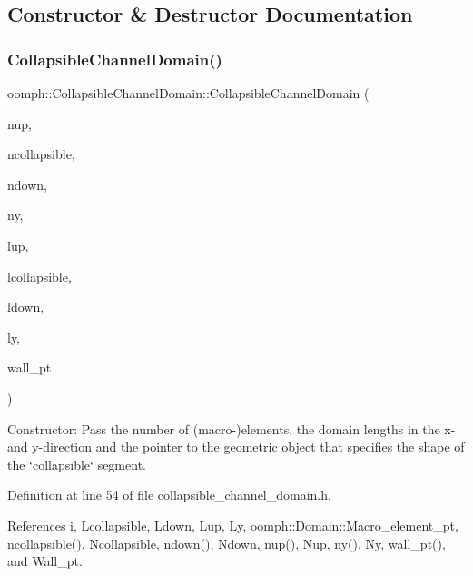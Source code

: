 \subsection{Constructor \& Destructor Documentation}
\mbox{\label{classoomph_1_1CollapsibleChannelDomain_a85e64b812b36155302407269d77dc6b3}} 
\subsubsection{\texorpdfstring{Collapsible\+Channel\+Domain()}{CollapsibleChannelDomain()}}
{\footnotesize\ttfamily oomph\+::\+Collapsible\+Channel\+Domain\+::\+Collapsible\+Channel\+Domain (\begin{DoxyParamCaption}\item[{const unsigned \&}]{nup,  }\item[{const unsigned \&}]{ncollapsible,  }\item[{const unsigned \&}]{ndown,  }\item[{const unsigned \&}]{ny,  }\item[{const double \&}]{lup,  }\item[{const double \&}]{lcollapsible,  }\item[{const double \&}]{ldown,  }\item[{const double \&}]{ly,  }\item[{\hyperlink{classoomph_1_1GeomObject}{Geom\+Object} $\ast$}]{wall\+\_\+pt }\end{DoxyParamCaption})\hspace{0.3cm}{\ttfamily [inline]}}



Constructor\+: Pass the number of (macro-\/)elements, the domain lengths in the x-\/ and y-\/direction and the pointer to the geometric object that specifies the shape of the \char`\"{}collapsible\char`\"{} segment. 



Definition at line 54 of file collapsible\+\_\+channel\+\_\+domain.\+h.



References i, Lcollapsible, Ldown, Lup, Ly, oomph\+::\+Domain\+::\+Macro\+\_\+element\+\_\+pt, ncollapsible(), Ncollapsible, ndown(), Ndown, nup(), Nup, ny(), Ny, wall\+\_\+pt(), and Wall\+\_\+pt.

